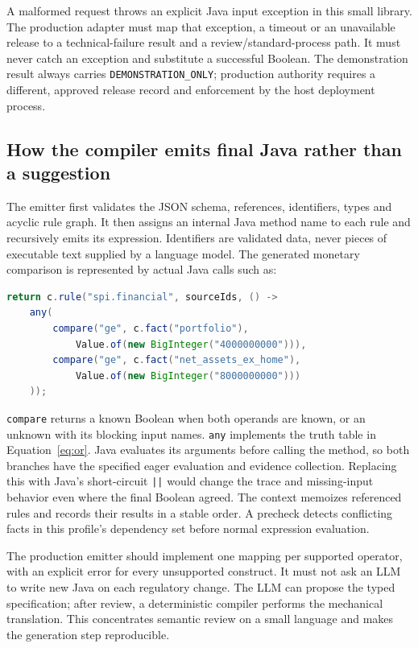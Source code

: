 A malformed request throws an explicit Java input exception in this small
library. The production adapter must map that exception, a timeout or an
unavailable release to a technical-failure result and a review/standard-process
path. It must never catch an exception and substitute a successful Boolean.
The demonstration result always carries \texttt{DEMONSTRATION\_ONLY}; production
authority requires a different, approved release record and enforcement by the
host deployment process.

\subsection{How the compiler emits final Java rather than a suggestion}
\label{merge:P-03d-java-delivery:03}


The emitter first validates the JSON schema, references, identifiers, types and
acyclic rule graph. It then assigns an internal Java method name to each rule
and recursively emits its expression. Identifiers are validated data, never
pieces of executable text supplied by a language model. The generated monetary
comparison is represented by actual Java calls such as:
\begin{lstlisting}[language=Java,caption={The generated financial method's essential body. The complete class is built and tested in the supplied example.}]
return c.rule("spi.financial", sourceIds, () ->
    any(
        compare("ge", c.fact("portfolio"),
            Value.of(new BigInteger("4000000000"))),
        compare("ge", c.fact("net_assets_ex_home"),
            Value.of(new BigInteger("8000000000")))
    ));
\end{lstlisting}
\texttt{compare} returns a known Boolean when both operands are known, or an
unknown with its blocking input names. \texttt{any} implements the truth table
in Equation~\eqref{eq:or}. Java evaluates its arguments before calling the
method, so both branches have the specified eager evaluation and evidence
collection. Replacing this with Java's short-circuit \texttt{||} would change
the trace and missing-input behavior even where the final Boolean agreed.
The context memoizes referenced rules and records their results in a stable
order. A precheck detects conflicting facts in this profile's dependency set
before normal expression evaluation.


The production emitter should implement one mapping per supported operator,
with an explicit error for every unsupported construct. It must not ask an LLM
to write new Java on each regulatory change. The LLM can propose the typed
specification; after review, a deterministic compiler performs the mechanical
translation. This concentrates semantic review on a small language and makes
the generation step reproducible.

